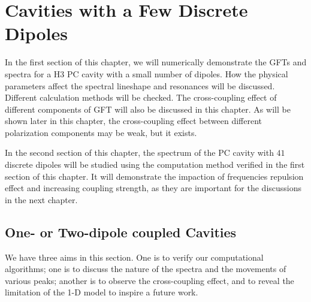 \chapter[Few-dipole Coupled Cavities]{Cavities with a Few Discrete Dipoles}\label{ch:cavity}


In the first section of this chapter, we will numerically demonstrate the GFTs and spectra for a H3 PC cavity with a small number of dipoles. How the physical parameters affect the spectral lineshape and resonances will be discussed. Different calculation methods will be checked.
The cross-coupling effect of different components of GFT will also be discussed in this chapter.
As will be shown later in this chapter,
the cross-coupling effect between different polarization components may be weak,
but it exists.

In the second section of this chapter, the spectrum of the PC cavity with $41$ discrete dipoles will be studied using the computation method verified in the first section of this chapter. It will demonstrate the impaction of frequencies repulsion effect and increasing coupling strength, as they are important for the discussions in the next chapter.


\section[One- and Two-dipole Coupled Cavities]{One- or Two-dipole coupled Cavities}
We have three aims in this section. One is to verify our computational algorithms; one is to discuss the nature of the spectra and the movements of various peaks; another is to observe the cross-coupling effect, and to reveal the limitation of the 1-D model to inspire a future work.

